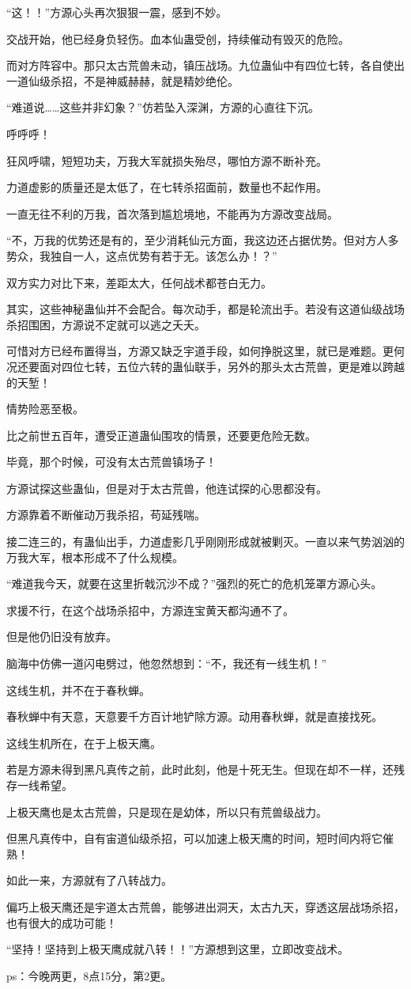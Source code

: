 \begin{this_body}
“这！！”方源心头再次狠狠一震，感到不妙。

交战开始，他已经身负轻伤。血本仙蛊受创，持续催动有毁灭的危险。

而对方阵容中。那只太古荒兽未动，镇压战场。九位蛊仙中有四位七转，各自使出一道仙级杀招，不是神威赫赫，就是精妙绝伦。

“难道说……这些并非幻象？”仿若坠入深渊，方源的心直往下沉。

呼呼呼！

狂风呼啸，短短功夫，万我大军就损失殆尽，哪怕方源不断补充。

力道虚影的质量还是太低了，在七转杀招面前，数量也不起作用。

一直无往不利的万我，首次落到尴尬境地，不能再为方源改变战局。

“不，万我的优势还是有的，至少消耗仙元方面，我这边还占据优势。但对方人多势众，我独自一人，这点优势有若于无。该怎么办！？”

双方实力对比下来，差距太大，任何战术都苍白无力。

其实，这些神秘蛊仙并不会配合。每次动手，都是轮流出手。若没有这道仙级战场杀招围困，方源说不定就可以逃之夭夭。

可惜对方已经布置得当，方源又缺乏宇道手段，如何挣脱这里，就已是难题。更何况还要面对四位七转，五位六转的蛊仙联手，另外的那头太古荒兽，更是难以跨越的天堑！

情势险恶至极。

比之前世五百年，遭受正道蛊仙围攻的情景，还要更危险无数。

毕竟，那个时候，可没有太古荒兽镇场子！

方源试探这些蛊仙，但是对于太古荒兽，他连试探的心思都没有。

方源靠着不断催动万我杀招，苟延残喘。

接二连三的，有蛊仙出手，力道虚影几乎刚刚形成就被剿灭。一直以来气势汹汹的万我大军，根本形成不了什么规模。

“难道我今天，就要在这里折戟沉沙不成？”强烈的死亡的危机笼罩方源心头。

求援不行，在这个战场杀招中，方源连宝黄天都沟通不了。

但是他仍旧没有放弃。

脑海中仿佛一道闪电劈过，他忽然想到：“不，我还有一线生机！”

这线生机，并不在于春秋蝉。

春秋蝉中有天意，天意要千方百计地铲除方源。动用春秋蝉，就是直接找死。

这线生机所在，在于上极天鹰。

若是方源未得到黑凡真传之前，此时此刻，他是十死无生。但现在却不一样，还残存一线希望。

上极天鹰也是太古荒兽，只是现在是幼体，所以只有荒兽级战力。

但黑凡真传中，自有宙道仙级杀招，可以加速上极天鹰的时间，短时间内将它催熟！

如此一来，方源就有了八转战力。

偏巧上极天鹰还是宇道太古荒兽，能够进出洞天，太古九天，穿透这层战场杀招，也有很大的成功可能！

“坚持！坚持到上极天鹰成就八转！！”方源想到这里，立即改变战术。

ps：今晚两更，8点15分，第2更。

\end{this_body}

